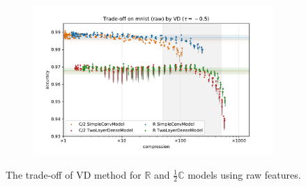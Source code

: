 \documentclass[a4paper,10pt]{article}
\newcommand{\real}{\mathbb{R}}
\newcommand{\cplx}{\mathbb{C}}
\begin{document}
\begin{figure}[b]
\begin{subfigure}[b]{0.5\textwidth}
  \end{subfigure}%
  \begin{subfigure}[b]{0.5\textwidth}
    \centering
    \includegraphics[width=\linewidth]{figure__mnist-like__trade-off/appendix__cmp__VD__mnist__raw__-0.5.pdf}
  \end{subfigure}
  \caption{%
    The trade-off of VD method for $\real$ and $\tfrac12\cplx$ models using raw features.
  }
  \label{fig:appendix__cmp__mnist-like__trade-off__VD__raw}
\end{figure}
\end{document}
